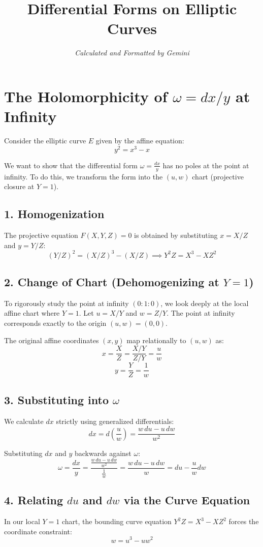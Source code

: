 \documentclass[12pt,letterpaper]{amsart}
\begin{document}
\pagestyle{plain}
\title{{\large {Differential Forms on Elliptic Curves}}}
\date{\textit{Calculated and Formatted by Gemini}}
\maketitle

\section{The Holomorphicity of $\omega = dx/y$ at Infinity}

Consider the elliptic curve $E$ given by the affine equation:
$$y^2 = x^3 - x$$

We want to show that the differential form $\omega = \frac{dx}{y}$ has no poles at the point at infinity. To do this, we transform the form into the $(u, w)$ chart (projective closure at $Y=1$).

\subsection{1. Homogenization}
The projective equation $F(X, Y, Z) = 0$ is obtained by substituting $x = X/Z$ and $y = Y/Z$:
$$(Y/Z)^2 = (X/Z)^3 - (X/Z) \implies Y^2 Z = X^3 - XZ^2$$

\subsection{2. Change of Chart (Dehomogenizing at $Y=1$)}
To rigorously study the point at infinity $(0:1:0)$, we look deeply at the local affine chart where $Y=1$. Let $u = X/Y$ and $w = Z/Y$. The point at infinity corresponds exactly to the origin $(u,w) = (0,0)$.

The original affine coordinates $(x, y)$ map relationally to $(u, w)$ as:
$$x = \frac{X}{Z} = \frac{X/Y}{Z/Y} = \frac{u}{w}$$
$$y = \frac{Y}{Z} = \frac{1}{w}$$

\subsection{3. Substituting into $\omega$}
We calculate $dx$ strictly using generalized differentials:
$$dx = d\left(\frac{u}{w}\right) = \frac{w\,du - u\,dw}{w^2}$$

Substituting $dx$ and $y$ backwards against $\omega$:
$$\omega = \frac{dx}{y} = \frac{\frac{w\,du - u\,dw}{w^2}}{\frac{1}{w}} = \frac{w\,du - u\,dw}{w} = du - \frac{u}{w}dw$$

\subsection{4. Relating $du$ and $dw$ via the Curve Equation}
In our local $Y=1$ chart, the bounding curve equation $Y^2 Z = X^3 - XZ^2$ forces the coordinate constraint:
$$w = u^3 - uw^2$$
\end{document}
